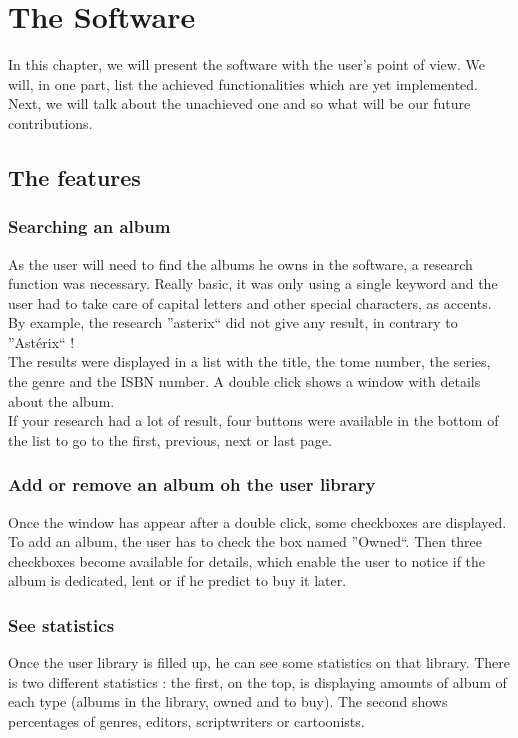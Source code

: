 \documentclass[11pt]{report} %
\begin{document}
\chapter{The Software}
In this chapter, we will present the software with the user's point of view. We will, in one part, list the achieved functionalities which are yet implemented. Next, we will talk about the unachieved one and so what will be our future contributions.

\section{The features}
\subsection{Searching an album}
As the user will need to find the albums he owns in the software, a research function was necessary. Really basic, it was only using a single keyword and the user had to take care of capital letters and other special characters, as accents. By example, the research ''asterix`` did not give any result, in contrary to ''Astérix`` !\\
The results were displayed in a list with the title, the tome number, the series, the genre and the ISBN number. A double click shows a window with details about the album.\\
If your research had a lot of result, four buttons were available in the bottom of the list to go to the first, previous, next or last page.

\subsection{Add or remove an album oh the user library}
Once the window has appear after a double click, some checkboxes are displayed. To add an album, the user has to check the box named ''Owned``. Then three checkboxes become available for details, which  enable the user to notice if the album is dedicated, lent or if he predict to buy it later.

\subsection{See statistics}
Once the user library is filled up, he can see some statistics on that library. There is two different statistics : the first, on the top, is displaying amounts of album of each type (albums in the library, owned and to buy). The second shows percentages of genres, editors, scriptwriters or cartoonists.
\end{document}
